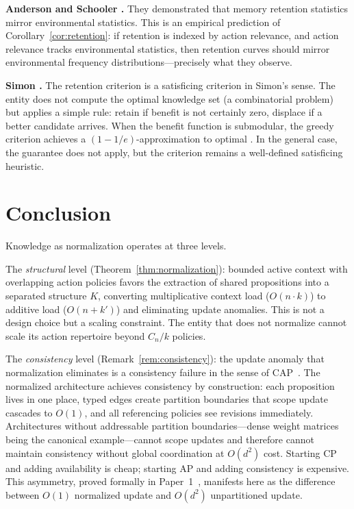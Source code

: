 \documentclass[11pt]{article}
\theoremstyle{definition}
\theoremstyle{remark}
\begin{document}
\textbf{Anderson and Schooler \cite{AndersonSchooler1991}.}
They demonstrated that memory retention statistics mirror environmental
statistics. This is an empirical prediction of
Corollary~\ref{cor:retention}: if retention is indexed by action
relevance, and action relevance tracks environmental statistics, then
retention curves should mirror environmental frequency
distributions---precisely what they observe.

\textbf{Simon \cite{Simon1955}.}
The retention criterion is a satisficing criterion in Simon's sense.
The entity does not compute the optimal knowledge set (a combinatorial
problem) but applies a simple rule: retain if benefit is not certainly
zero, displace if a better candidate arrives. When the benefit function
is submodular, the greedy criterion achieves a $(1 - 1/e)$-approximation
to optimal \cite{Nemhauser1978}. In the general case, the guarantee does
not apply, but the criterion remains a well-defined satisficing
heuristic.

\section{Conclusion}
\label{sec:conclusion}

Knowledge as normalization operates at three levels.

The \emph{structural} level (Theorem~\ref{thm:normalization}):
bounded active context with overlapping action policies favors the
extraction of shared propositions into a separated structure $K$,
converting multiplicative context load ($O(n \cdot k)$) to additive
load ($O(n + k')$) and eliminating update anomalies. This is not a
design choice but a scaling constraint. The entity that does not
normalize cannot scale its action repertoire beyond $C_n / k$ policies.

The \emph{consistency} level (Remark~\ref{rem:consistency}):
the update anomaly that normalization eliminates is a consistency
failure in the sense of CAP~\cite{Brewer2000, Gilbert2002}. The
normalized architecture achieves consistency by construction: each
proposition lives in one place, typed edges create partition
boundaries that scope update cascades to $O(1)$, and all referencing
policies see revisions immediately. Architectures without addressable
partition boundaries---dense weight matrices being the canonical
example---cannot scope updates and therefore cannot maintain consistency
without global coordination at $O(d^2)$ cost. Starting CP and adding
availability is cheap; starting AP and adding consistency is expensive.
This asymmetry, proved formally in Paper~1~\cite{McCarthy2026a},
manifests here as the difference between $O(1)$ normalized update and
$O(d^2)$ unpartitioned update.
\end{document}
